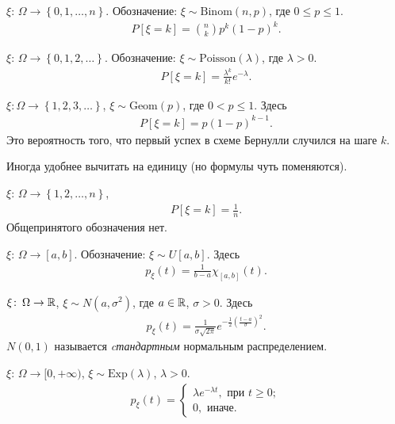 \begin{exmpl}
 $ \xi \colon\, \Omega \to \left\{ 0, 1, \ldots, n \right\} $. Обозначение: $ \xi \sim \mathrm{Binom}(n,p) $, где $ 0 \leqslant p \leqslant 1 $.
 \begin{align*}
  P[\xi = k] = \binom n k p^{k}(1-p)^{k}.
 \end{align*} 
\end{exmpl}
\begin{exmpl}
$ \xi \colon\, \Omega \to \left\{ 0, 1, 2, \ldots \right\} $. Обозначение: $ \xi \sim \mathrm{Poisson}(\lambda) $, где $ \lambda > 0 $.
  \begin{align*}
  P[\xi = k] = \frac{\lambda^{k}}{k!}e^{-\lambda}.
 \end{align*} 
\end{exmpl}
\begin{exmpl}
$ \xi \colon \Omega \to \left\{ 1,2,3, \ldots \right\} $, $ \xi \sim \mathrm{Geom}(p) $, где $ 0 < p \leqslant 1 $. Здесь
\begin{align*}
 P[\xi = k] = p(1 - p)^{k-1}.
\end{align*} Это вероятность того, что первый успех в схеме Бернулли случился на шаге $ k $.

 Иногда удобнее вычитать на единицу (но формулы чуть поменяются).
\end{exmpl}

\begin{exmpl}
 $ \xi \colon\, \Omega \to \left\{ 1,2,\ldots,n \right\} $,
 \begin{align*}
  P[\xi = k] = \frac{1}{n}.
 \end{align*} Общепринятого обозначения нет.
\end{exmpl}
\begin{exmpl}
 $ \xi\colon\,\Omega\to[a,b] $. Обозначение: $ \xi \sim U[a,b] $. Здесь
 \begin{align*}
  p_{\xi}(t) = \frac{1}{b-a} \chi_{[a,b]}(t).
 \end{align*} 
\end{exmpl}
\begin{exmpl}
$ \xi \colon\,\Omega \to \mathbb{R} $, $ \xi \sim N(a,\sigma^{2}) $, где $ a \in \mathbb{R} $, $ \sigma > 0 $. Здесь
\begin{align*}
	p_{\xi}(t) = \frac{1}{\sigma\sqrt{2\pi}}e^{-\frac{1}{2}\left(\frac{t-a} {\sigma}\right)^2}
.\end{align*} $ N(0,1) $ называется \textit{cтандартным} нормальным распределением.
\end{exmpl}
\begin{exmpl}
$ \xi \colon\,\Omega\to[0,+\infty) $, $ \xi \sim \mathrm{Exp}(\lambda) $, $ \lambda > 0 $.
\begin{align*}
 p_{\xi}(t) = \begin{cases}
   \lambda e^{-\lambda t}, \text{ при } t \geqslant 0;  \\
  0, \text{ иначе. }
 \end{cases} 
\end{align*} 
\end{exmpl}

